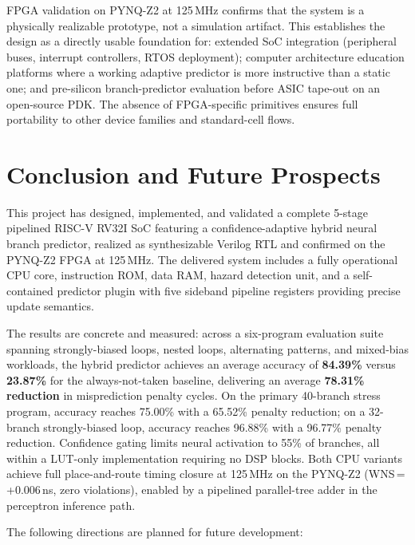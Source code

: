 \documentclass[12pt,a4paper]{article}
\begin{document}
FPGA validation on PYNQ-Z2 at 125\,MHz confirms that the system is a physically
realizable prototype, not a simulation artifact. This establishes the design as
a directly usable foundation for: extended SoC integration (peripheral buses,
interrupt controllers, RTOS deployment); computer architecture education platforms
where a working adaptive predictor is more instructive than a static one; and
pre-silicon branch-predictor evaluation before ASIC tape-out on an open-source PDK.
The absence of FPGA-specific primitives ensures full portability to other device
families and standard-cell flows.

\section{Conclusion and Future Prospects}
\label{sec:conclusion}

This project has designed, implemented, and validated a complete 5-stage
pipelined RISC-V RV32I SoC featuring a confidence-adaptive hybrid neural branch
predictor, realized as synthesizable Verilog RTL and confirmed on the PYNQ-Z2
FPGA at 125\,MHz. The delivered system includes a fully operational CPU core,
instruction ROM, data RAM, hazard detection unit, and a self-contained predictor
plugin with five sideband pipeline registers providing precise update semantics.

The results are concrete and measured: across a six-program evaluation
suite spanning strongly-biased loops, nested loops, alternating patterns, and
mixed-bias workloads, the hybrid predictor achieves an average accuracy of
\textbf{84.39\%} versus \textbf{23.87\%} for the always-not-taken baseline,
delivering an average \textbf{78.31\% reduction} in misprediction penalty
cycles. On the primary 40-branch stress program, accuracy reaches 75.00\%
with a 65.52\% penalty reduction; on a 32-branch strongly-biased loop, accuracy
reaches 96.88\% with a 96.77\% penalty reduction. Confidence gating limits
neural activation to 55\% of branches, all within a LUT-only implementation
requiring no DSP blocks. Both CPU variants achieve full place-and-route timing
closure at 125\,MHz on the PYNQ-Z2 (WNS\,=\,+0.006\,ns, zero violations),
enabled by a pipelined parallel-tree adder in the perceptron inference path.

The following directions are planned for future development:
\end{document}
